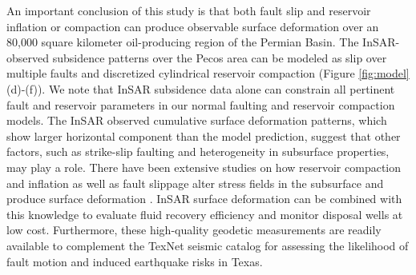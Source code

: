 An important conclusion of this study is that both fault slip and reservoir inflation or compaction can produce observable surface deformation over an 80,000 square kilometer oil-producing region of the Permian Basin. The InSAR-observed subsidence patterns over the Pecos area can be modeled as slip over multiple faults and discretized cylindrical reservoir compaction (Figure \ref{fig:model} (d)-(f)). We note that InSAR subsidence data alone can constrain all pertinent fault and reservoir parameters in our normal faulting and reservoir compaction models. The InSAR observed cumulative surface deformation patterns, which show larger horizontal component than the model prediction, suggest that other factors, such as strike-slip faulting and heterogeneity in subsurface properties, may play a role. There have been extensive studies on how reservoir compaction and inflation as well as fault slippage alter stress fields in the subsurface and produce surface deformation \citep{Geertsma1973LandSubsidenceCompacting,Segall1992InducedStressesDue,Okada1992InternalDeformationDue,Du1992ComparisonVariousInversion,Vasco2005UseQuasiStatic,Vasco2008ReservoirMonitoringCharacterization,Khakim2012GeomechanicalModelingInsar}. InSAR surface deformation can be combined with this knowledge to evaluate fluid recovery efficiency and monitor disposal wells at low cost. Furthermore, these high-quality geodetic measurements are readily available to complement the TexNet seismic catalog for assessing the likelihood of fault motion and induced earthquake risks in Texas.


